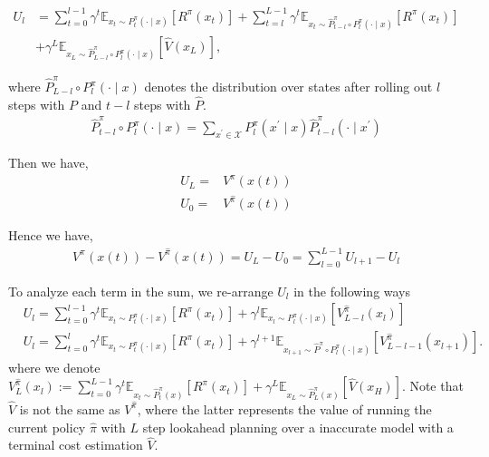 \begin{align*}
U_l & =\sum_{t=0}^{l-1} \gamma^t \mathbb{E}_{x_t \sim P_t^\pi(\cdot \mid x)}\left[R^\pi\left(x_t\right)\right]+\sum_{t=l}^{L-1} \gamma^t \mathbb{E}_{x_t \sim \hat{P}_{t-l}^\pi \circ P_l^\pi(\cdot \mid x)}\left[R^\pi\left(x_t\right)\right] \\
&+\gamma^L \mathbb{E}_{x_L \sim \hat{P}_{L-l}^\pi \circ P_l^\pi(\cdot \mid x)}\left[\hat{V}\left(x_L\right)\right],
\end{align*}

where $ \hat{P}_{L-l}^\pi \circ P_l^\pi(\cdot \mid x)$ denotes the distribution over states after rolling out $l$ steps with $P$ and $t-l$ steps with $\hat{P}$.
\begin{align*}
    \hat{P}_{t-l}^\pi \circ P_l^\pi(\cdot \mid x)=\sum_{x^{\prime} \in \mathcal{X}} P_l^\pi\left(x^{\prime} \mid x\right) \hat{P}_{t-l}^\pi\left(\cdot \mid x^{\prime}\right)
\end{align*}

Then we have,
\begin{align*}
    U_L = &  V^{{\pi}}(x(t))\\
    U_0 = & V^{\hat{\pi}}(x(t))
\end{align*}

Hence we have,
\begin{align*}
      V^{{\pi}^{}}(x(t))- V^{\hat{\pi}}(x(t)) = U_L-U_0=\sum_{l=0}^{L-1} U_{l+1}-U_{l}
\end{align*}

To analyze each term in the sum, we re-arrange $U_l$ in the following ways
\begin{align}
& U_l=\sum_{t=0}^{l-1} \gamma^t \mathbb{E}_{x_t \sim P_t^\pi(\cdot \mid x)}\left[R^\pi\left(x_t\right)\right]+\gamma^l \mathbb{E}_{x_l \sim P_l^\pi(\cdot \mid x)}\left[{V}^{\hat{\pi}}_{L-l}\left(x_l\right)\right]  \label{eqn:arrange1}\\
& U_l=\sum_{t=0}^l \gamma^t \mathbb{E}_{x_t \sim P_t^\pi(\cdot \mid x)}\left[R^\pi\left(x_t\right)\right]+\gamma^{l+1} \mathbb{E}_{x_{l+1} \sim \hat{P}^\pi \circ P_l^\pi(\cdot \mid x)}\left[{V}^{\hat{\pi}}_{L-l-1}\left(x_{l+1}\right)\right] . \label{eqn:arrange2}
\end{align}
where we denote ${V}^{\hat{\pi}}_{L}\left(x_l\right):=\sum_{t=0}^{L-1} \gamma^t \mathbb{E}_{x_t \sim \hat{P}_t^\pi(x)}\left[R^\pi\left(x_t\right)\right]+\gamma^L \mathbb{E}_{x_L \sim \hat{P}_L^\pi(x)}\left[\hat{V}\left(x_H\right)\right]$. Note that $\hat{V}$ is not the same as $V^{\hat{\pi}}$, where the latter represents the value of running the current policy $\hat{\pi}$ with $L$ step lookahead planning over a inaccurate model with a terminal cost estimation $\hat{V}$.

